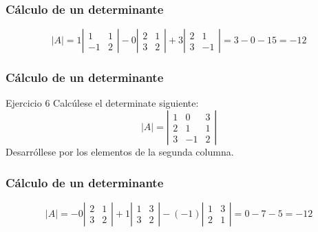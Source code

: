 \documentclass[aspectratio=169]{beamer}
\begin{document}
\begin{frame}
  \frametitle{C\'alculo de un determinante}
\[|A| = 1\left|\begin{array}{cc} 1 & 1 \\ -1 & 2\end{array}\right|
-0\left|\begin{array}{cc} 2 & 1 \\ 3 & 2\end{array}\right|
+3\left|\begin{array}{cc} 2 & 1 \\ 3 & -1\end{array}\right| = 3-0-15 = -12\]
\end{frame}   


\begin{frame}
  \frametitle{C\'alculo de un determinante}
     \begin{block}{Ejercicio 6}
Calc\'ulese el determinate siguiente:
\[|A| = \left|\begin{array}{ccc}1 & 0 & 3 \\2 & 1 & 1 \\3 & -1 & 2\end{array}\right|\]
Desarr\'ollese por los elementos de la segunda columna.
\end{block}
\end{frame} 

\begin{frame}
  \frametitle{C\'alculo de un determinante}
\[|A| = -0\left|\begin{array}{cc} 2 & 1 \\ 3 & 2\end{array}\right|
+1\left|\begin{array}{cc} 1 & 3 \\ 3 & 2\end{array}\right|
-(-1)\left|\begin{array}{cc} 1 & 3 \\ 2 & 1\end{array}\right| = 0-7-5 = -12\]
\end{frame}   
\end{document}
